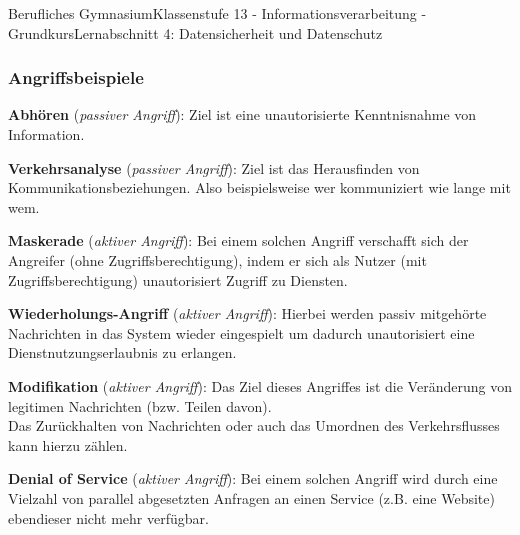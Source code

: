 \documentclass[11pt,oneside,openany,headings=optiontotoc,11pt,numbers=noenddot]{article}
\begin{document}
\begin{worksheet}{Berufliches Gymnasium}{Klassenstufe 13 - Informationsverarbeitung - Grundkurs}{Lernabschnitt 4: Datensicherheit und Datenschutz}
		\subsubsection{Angriffsbeispiele}
		\textbf{Abhören} (\textit{passiver Angriff}): Ziel ist eine unautorisierte Kenntnisnahme von Information.\\
		\par\noindent
		\textbf{Verkehrsanalyse} (\textit{passiver Angriff}): Ziel ist das Herausfinden von Kommunikationsbeziehungen. Also beispielsweise wer kommuniziert wie lange mit wem.\\
		\par\noindent
		\textbf{Maskerade} (\textit{aktiver Angriff}): Bei einem solchen Angriff verschafft sich der Angreifer (ohne Zugriffsberechtigung), indem er sich als Nutzer (mit Zugriffsberechtigung) unautorisiert Zugriff zu Diensten.\\
		\par\noindent
		\textbf{Wiederholungs-Angriff} (\textit{aktiver Angriff}): Hierbei werden passiv mitgehörte Nachrichten in das System wieder eingespielt um dadurch unautorisiert eine Dienstnutzungserlaubnis zu erlangen.\\
		\par\noindent
		\textbf{Modifikation} (\textit{aktiver Angriff}): Das Ziel dieses Angriffes ist die Veränderung von legitimen Nachrichten (bzw. Teilen davon).\\
		Das Zurückhalten von Nachrichten oder auch das Umordnen des Verkehrsflusses kann hierzu zählen.\\
		\par\noindent
		\textbf{Denial of Service} (\textit{aktiver Angriff}): Bei einem solchen Angriff wird durch eine Vielzahl von parallel abgesetzten Anfragen an einen Service (z.B. eine Website) ebendieser nicht mehr verfügbar.
	\end{worksheet}
\end{document}
